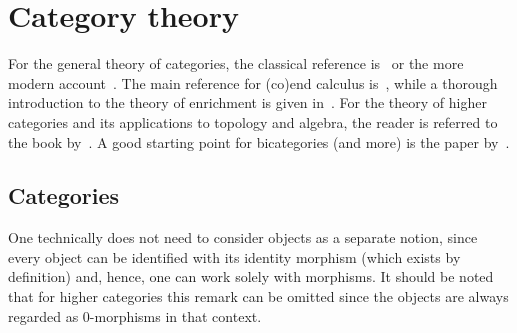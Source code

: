 \chapter{Category theory}\label{chapter:cat}

    For the general theory of categories, the classical reference is~\citet{mac_lane_categories_2013} or the more modern account~\citet{riehl_category_2017}. The main reference for (co)end calculus is~\citet{loregian_coend_2021}, while a thorough introduction to the theory of enrichment is given in~\citet{kelly_basic_1982}. For the theory of higher categories and its applications to topology and algebra, the reader is referred to the book by~\citet{baez_towards_2009}. A good starting point for bicategories (and more) is the paper by~\citet{leinster_basic_1998}.

    \minitoc

\section{Categories}

    \begin{remark}
        One technically does not need to consider objects as a separate notion, since every object can be identified with its identity morphism (which exists by definition) and, hence, one can work solely with morphisms. It should be noted that for higher categories this remark can be omitted since the objects are always regarded as 0-morphisms in that context.
    \end{remark}

